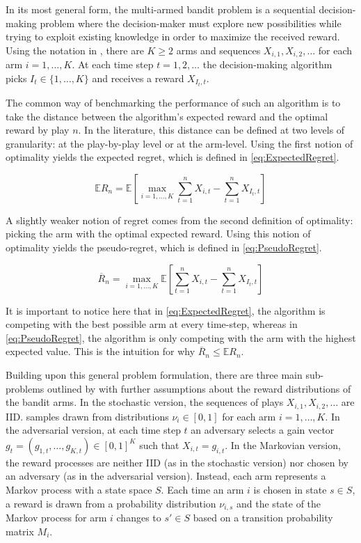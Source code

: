 In its most general form, the multi-armed bandit problem is a sequential decision-making problem where the decision-maker must explore new possibilities while trying to exploit existing knowledge in order to maximize the received reward. Using the notation in \cite{bubeck12}, there are $K \geq{2}$ arms and sequences $X_{i, 1}, X_{i, 2}, \ldots $ for each arm $i = 1, \ldots, K$. At each time step $t = 1, 2, \ldots$ the decision-making algorithm picks $I_t \in \{1, \ldots, K\}$ and receives a reward $X_{I_t, t}$.

The common way of benchmarking the performance of such an algorithm is to take the distance between the algorithm's expected reward and the optimal reward by play $n$. In the literature, this distance can be defined at two levels of granularity: at the play-by-play level or at the arm-level. Using the first notion of optimality yields the expected regret, which is defined in \autoref{eq:ExpectedRegret}.

\begin{equation}
\label{eq:ExpectedRegret}
\mathbb{E}R_n = \mathbb{E}\left[ \max_{i=1, \ldots, K}{\sum_{t=1}^{n}{X_{i, t}}} - \sum_{t=1}^{n}{X_{I_t, t}}\right]
\end{equation}

A slightly weaker notion of regret comes from the second definition of optimality: picking the arm with the optimal expected reward. Using this notion of optimality yields the pseudo-regret, which is defined in \autoref{eq:PseudoRegret}.

\begin{equation}
\label{eq:PseudoRegret}
\overline{R}_n = \max_{i=1, \ldots, K}\mathbb{E}\left[\sum_{t=1}^{n}{X_{i, t}} - \sum_{t=1}^{n}{X_{I_t, t}}\right]
\end{equation}

It is important to notice here that in \autoref{eq:ExpectedRegret}, the algorithm is competing with the best possible arm at every time-step, whereas in \autoref{eq:PseudoRegret}, the algorithm is only competing with the arm with the highest expected value. This is the intuition for why $\overline{R}_n \leq{\mathbb{E}R_n}$.

Building upon this general problem formulation, there are three main sub-problems outlined by \cite{bubeck12} with further assumptions about the reward distributions of the bandit arms. In the stochastic version, the sequences of plays $X_{i, 1}, X_{i, 2}, \ldots $ are IID. samples drawn from distributions $\nu_i \in [0, 1]$ for each arm $i = 1, \ldots, K$. In the adversarial version, at each time step $t$ an adversary selects a gain vector $g_t = (g_{1, t}, \ldots, g_{K, t}) \in [0, 1]^{K}$ such that $X_{i, t} = g_{i, t}$. In the Markovian version, the reward processes are neither IID (as in the stochastic version) nor chosen by an adversary (as in the adversarial version). Instead, each arm represents a Markov process with a state space $S$. Each time an arm $i$ is chosen in state $s \in{S}$, a reward is drawn from a probability distribution $\nu_{i, s}$ and the state of the Markov process for arm $i$ changes to $s' \in {S}$ based on a transition probability matrix $M_i$.

